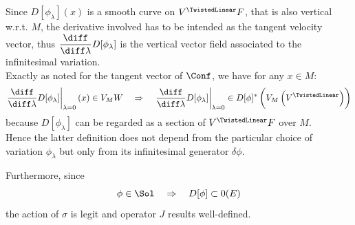 \documentclass[a4paper,12pt,fleqn]{scrartcl}  %
\begin{document}
Since $D[\phi_\lambda](x)$ is a smooth curve on $ V^\TwistedLinear F $, that is also vertical w.r.t. $M$, 
the derivative involved has to be intended as the tangent velocity vector,
thus $\dfrac{\diff}{\diff \lambda} D [\phi_\lambda]$ is the vertical vector field associated to the infinitesimal variation.\\
Exactly as noted for the tangent vector of $\Conf$, we have for any $x\in M$:
		\begin{displaymath}
			\left.\dfrac{\diff}{\diff \lambda} D [\phi_\lambda]\right\rvert_{\lambda=0}(x) \in V_M W
			\quad \Rightarrow \quad
			\left.\dfrac{\diff}{\diff \lambda} D [\phi_\lambda]\right\rvert_{\lambda=0} \in D[\phi]^\ast \left( V_M \left( V^\TwistedLinear \right)\right)
		\end{displaymath}
		because $D[\phi_\lambda]$ can be regarded as a section of $V^\TwistedLinear F$ over $M$.\\
		Hence the latter definition does not depend from the particular choice of variation $\phi_\lambda$ 
		but only from its infinitesimal generator $\delta\phi$.

Furthermore, since
\begin{displaymath}
	\phi \in \Sol \quad \Rightarrow \quad D[\phi] \subset 0(E)
\end{displaymath}
the action of $\sigma$ is legit and operator $J$ results well-defined.
%
\end{document}

